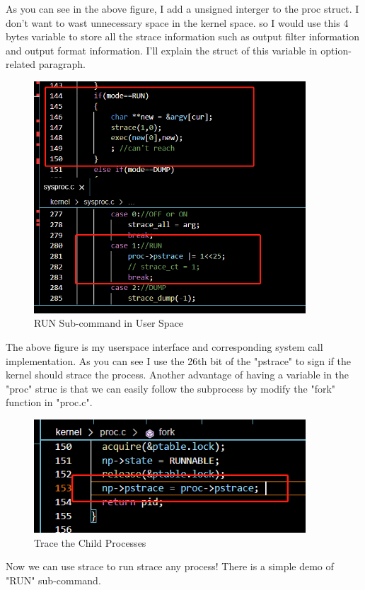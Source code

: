 \documentclass[11pt,oneside,a4paper]{article}
\begin{document}
As you can see in the above figure, I add a unsigned interger to the proc struct.
I don't want to wast unnecessary space in the kernel space.
so I would use this 4 bytes variable to store all the strace information such as 
output filter information and output format information. I'll explain the struct of
this variable in option-related paragraph.

\begin{figure}[H]
    \includegraphics[width=4.00in]{1-16.png}
    \centering
    \caption{RUN Sub-command in User Space}
\end{figure}

The above figure is my userspace interface and corresponding system call implementation.
As you can see I use the 26th bit of the "pstrace" to sign if the kernel should strace
the process. Another advantage of having a variable in the "proc" struc is that we can 
easily follow the subprocess by modify the "fork" function in "proc.c".

\begin{figure}[H]
    \includegraphics[width=4.00in]{1-17.png}
    \centering
    \caption{Trace the Child Processes}
\end{figure}

Now we can use strace to run strace any process! There is a simple demo of "RUN" 
sub-command.
\end{document}
